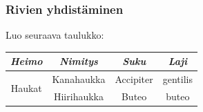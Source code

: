 \begin{fframe}
    \frametitle{Rivien yhdistäminen} 
    \begin{harj}
        \label{taulukko}
        Luo seuraava taulukko: 
        \begin{table}
            \begin{serif}
                \begin{tabular}{|c|c|c|c|}
                    \hline
                    \textit{Heimo} & \textit{Nimitys} & \textit{Suku} & \textit{Laji}\\ \hline
                    \multirow{2}{*}{Haukat} & Kanahaukka & Accipiter &  gentilis\\ \cline{2-4}
                                            & Hiirihaukka & Buteo & buteo\\ \hline
                \end{tabular}
            \end{serif}
        \end{table}
    \end{harj}
\end{fframe}

